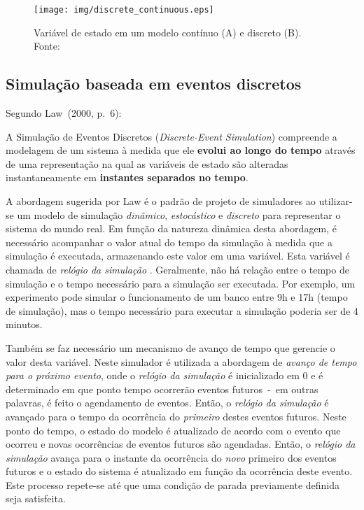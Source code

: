 \begin{enumerate}
\begin{figure}[htb!]
\centering\texttt{[image: img/discrete\_continuous.eps]}
\caption[Variável de estado em um modelo contínuo e discreto]{\label{fig:disccont}Variável de estado em um modelo contínuo (A) e discreto (B). Fonte:~\cite{Banks}}
\end{figure}

\end{enumerate}

\subsection{\label{simulator:movation:discrete}Simulação baseada em eventos discretos}

Segundo Law~(2000, p.~6):

\begin{directcite}
A Simulação de Eventos Discretos (\textit{Discrete-Event Simulation}) compreende
a modelagem de um sistema à medida que ele \textbf{evolui ao longo do tempo}
através de uma representação na qual as variáveis de estado são alteradas
instantaneamente em \textbf{instantes separados no tempo}.
\end{directcite}

A abordagem sugerida por Law é o padrão de projeto de simuladores ao utilizar-se
um modelo de simulação \textit{dinâmico}, \textit{estocástico} e
\textit{discreto} para representar o sistema do mundo real. Em função da
natureza dinâmica desta abordagem, é necessário acompanhar o valor atual do
tempo da simulação à medida que a simulação é executada, armazenando este valor
em uma variável. Esta variável é chamada de \textit{relógio da simulação}
\cite{Law}. Geralmente, não há relação entre o tempo de simulação e o tempo
necessário para a simulação ser executada. Por exemplo, um experimento pode
simular o funcionamento de um banco entre 9h e 17h (tempo de simulação), mas o
tempo necessário para executar a simulação poderia ser de 4 minutos.

Também se faz necessário um mecanismo de avanço de tempo que gerencie o valor
desta variável. Neste simulador é utilizada a abordagem de \textit{avanço de
tempo para o próximo evento}, onde o \textit{relógio da simulação} é
inicializado em 0 e é determinado em que ponto tempo ocorrerão eventos
futuros~-~em outras palavras, é feito o agendamento de eventos. Então, o
\textit{relógio da simulação} é avançado para o tempo da ocorrência do
\textit{primeiro} destes eventos futuros. Neste ponto do tempo, o estado do
modelo é atualizado de acordo com o evento que ocorreu e novas ocorrências de
eventos futuros são agendadas. Então, o \textit{relógio da simulação} avança
para o instante da ocorrência do \textit{novo} primeiro dos eventos futuros e o
estado do sistema é atualizado em função da ocorrência deste evento. Este
processo repete-se até que uma condição de parada previamente definida seja
satisfeita.

